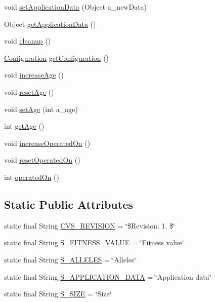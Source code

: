 \begin{DoxyCompactItemize}
void \hyperlink{interfaceorg_1_1jgap_1_1_i_chromosome_a99da03ae9bca8f2ca884186aea82c771}{set\-Application\-Data} (Object a\-\_\-new\-Data)
\item 
Object \hyperlink{interfaceorg_1_1jgap_1_1_i_chromosome_a1734f351c78c6d36bec48fdc8a334902}{get\-Application\-Data} ()
\item 
void \hyperlink{interfaceorg_1_1jgap_1_1_i_chromosome_a184e942f9b44185236492ee7261b2b14}{cleanup} ()
\item 
\hyperlink{classorg_1_1jgap_1_1_configuration}{Configuration} \hyperlink{interfaceorg_1_1jgap_1_1_i_chromosome_a4426723f5d26695fd80a0b28b3acb9eb}{get\-Configuration} ()
\item 
void \hyperlink{interfaceorg_1_1jgap_1_1_i_chromosome_a651016ea5a204fc14c7c146e32fd76cf}{increase\-Age} ()
\item 
void \hyperlink{interfaceorg_1_1jgap_1_1_i_chromosome_aefc4884cc5bbbc511feb8d9ec827a31f}{reset\-Age} ()
\item 
void \hyperlink{interfaceorg_1_1jgap_1_1_i_chromosome_a9146b114972d86aac3cfb32b249b166f}{set\-Age} (int a\-\_\-age)
\item 
int \hyperlink{interfaceorg_1_1jgap_1_1_i_chromosome_a6186b5e6184d55dbc03adee6bacc8e9a}{get\-Age} ()
\item 
void \hyperlink{interfaceorg_1_1jgap_1_1_i_chromosome_a8fda999d5a66640dd577bcff960b368b}{increase\-Operated\-On} ()
\item 
void \hyperlink{interfaceorg_1_1jgap_1_1_i_chromosome_a4fb2f78d39b20b7f5a9ff8d37402f7bd}{reset\-Operated\-On} ()
\item 
int \hyperlink{interfaceorg_1_1jgap_1_1_i_chromosome_a47f09dd85e4f9f0e3908c85b63394a7d}{operated\-On} ()
\end{DoxyCompactItemize}
\subsection*{Static Public Attributes}
\begin{DoxyCompactItemize}
\item 
static final String \hyperlink{interfaceorg_1_1jgap_1_1_i_chromosome_a4e7381b89963f2ee6f69839b38ea8dab}{C\-V\-S\-\_\-\-R\-E\-V\-I\-S\-I\-O\-N} = \char`\"{}\$Revision\-: 1. \$\char`\"{}
\item 
static final String \hyperlink{interfaceorg_1_1jgap_1_1_i_chromosome_a34c8c0933688a10837692d1c0024f663}{S\-\_\-\-F\-I\-T\-N\-E\-S\-S\-\_\-\-V\-A\-L\-U\-E} = \char`\"{}Fitness value\char`\"{}
\item 
static final String \hyperlink{interfaceorg_1_1jgap_1_1_i_chromosome_ae93666d5923e449f45656ad5fed52f84}{S\-\_\-\-A\-L\-L\-E\-L\-E\-S} = \char`\"{}Alleles\char`\"{}
\item 
static final String \hyperlink{interfaceorg_1_1jgap_1_1_i_chromosome_a03218ba49e2c53108005cd6290252284}{S\-\_\-\-A\-P\-P\-L\-I\-C\-A\-T\-I\-O\-N\-\_\-\-D\-A\-T\-A} = \char`\"{}Application data\char`\"{}
\item 
static final String \hyperlink{interfaceorg_1_1jgap_1_1_i_chromosome_a50371491243a21f494112bf66d2e1a26}{S\-\_\-\-S\-I\-Z\-E} = \char`\"{}Size\char`\"{}
\end{DoxyCompactItemize}


